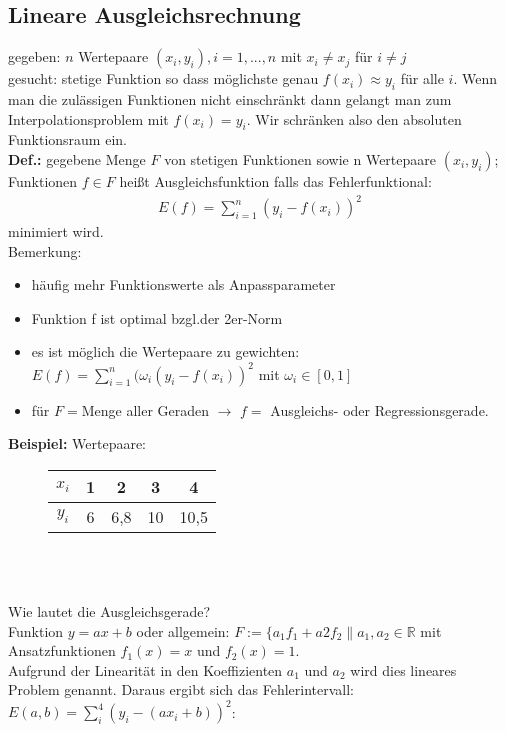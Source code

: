 \documentclass{scrartcl}
\begin{document}
\subsection{Lineare Ausgleichsrechnung}
gegeben: $n$ Wertepaare $(x_i,y_i), i=1,...,n$ mit $x_i \neq x_j$ für $i \neq j$ \\
gesucht: stetige Funktion so dass möglichste genau $f(x_i) \approx y_i$ für alle $i$.
Wenn man die zulässigen Funktionen nicht einschränkt dann gelangt man zum Interpolationsproblem mit $f(x_i)=y_i$.
Wir schränken also den absoluten Funktionsraum ein.\\
\textbf{Def.:} gegebene Menge $F$ von stetigen Funktionen sowie n Wertepaare $(x_i, y_i)$; Funktionen $f \in F$ heißt Ausgleichsfunktion falls das Fehlerfunktional:
\begin{align*}
E(f)= \sum_{i=1}^n (y_i-f(x_i))^2
\end{align*}
minimiert wird.\\
Bemerkung: \begin{itemize}
\item häufig mehr Funktionswerte als Anpassparameter
\item Funktion f ist optimal bzgl.der 2er-Norm
\item es ist möglich die Wertepaare zu gewichten: $E(f)=  \sum_{i=1}^n (\omega_i(y_i-f(x_i))^2$ mit $\omega_i \in [0,1]$
\item für $F=$Menge aller Geraden $\rightarrow$ $f=$ Ausgleichs- oder Regressionsgerade.
\end{itemize}
\textbf{Beispiel:}
Wertepaare: \begin{figure}
\center

\begin{tabular}{|c||c|c|c|c|}

$x_i$ & 1 & 2 & 3 & 4 \\ 
\hline 
$y_i$ & 6 & 6,8 & 10 & 10,5 \\ 

\end{tabular}\\  
\end{figure}
\\
Wie lautet die Ausgleichsgerade? \\
Funktion $y=a x +b$ oder allgemein: $F:=\{a_1 f_1+a2 f_2\|a_1,a_2 \in \mathbb{R}$ mit Ansatzfunktionen $f_1(x)=x$ und $f_2(x)=1$.\\
Aufgrund der Linearität in den Koeffizienten $a_1$ und $a_2$ wird dies lineares Problem genannt.
Daraus ergibt sich das Fehlerintervall: $E(a,b)=\sum_i^4(y_i-(a x_i+b))^2$:
\end{document}
